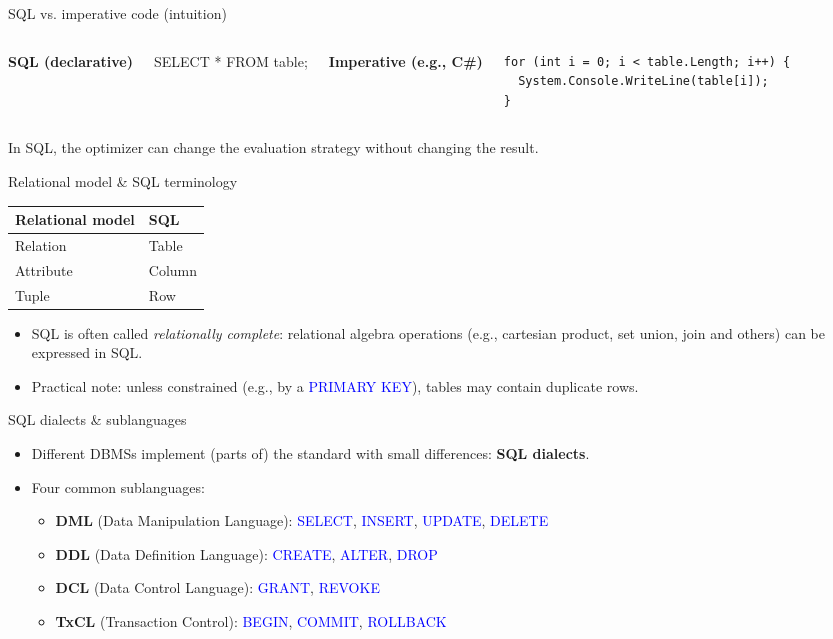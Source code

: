 \documentclass[10pt,aspectratio=169]{beamer}
\newcommand{\sqlk}[1]{\textcolor{blue}{#1}}
\begin{document}
\begin{frame}[fragile]{SQL vs. imperative code (intuition)}
\begin{columns}[T,onlytextwidth]
\textbf{SQL (declarative)}
\begin{codesql}
SELECT *
FROM table;
\end{codesql}
\textbf{Imperative (e.g., C\#)}
\begin{lstlisting}[language={[Sharp]C},basicstyle=\small\ttfamily]
for (int i = 0; i < table.Length; i++) {
  System.Console.WriteLine(table[i]);
}
\end{lstlisting}
\end{columns}
\vspace{0.6em}
\small In SQL, the optimizer can change the evaluation strategy without changing the result.
\end{frame}

\begin{frame}{Relational model \& SQL terminology}
\begin{center}
\begin{tabular}{ll}
\toprule
\textbf{Relational model} & \textbf{SQL}\\
\midrule
Relation & Table\\
Attribute & Column\\
Tuple & Row\\
\bottomrule
\end{tabular}
\end{center}
\vspace{0.8em}
\begin{itemize}
  \item SQL is often called \emph{relationally complete}: relational algebra operations (e.g., cartesian product, set union, join and others) can be expressed in SQL.
  \item Practical note: unless constrained (e.g., by a \sqlk{PRIMARY KEY}), tables may contain duplicate rows.
\end{itemize}
\end{frame}

\begin{frame}{SQL dialects \& sublanguages}
\begin{itemize}
  \item Different DBMSs implement (parts of) the standard with small differences: \textbf{SQL dialects}.
  \item Four common sublanguages:
  \begin{itemize}
    \item \textbf{DML} (Data Manipulation Language): \sqlk{SELECT}, \sqlk{INSERT}, \sqlk{UPDATE}, \sqlk{DELETE}
    \item \textbf{DDL} (Data Definition Language): \sqlk{CREATE}, \sqlk{ALTER}, \sqlk{DROP}
    \item \textbf{DCL} (Data Control Language): \sqlk{GRANT}, \sqlk{REVOKE}
    \item \textbf{TxCL} (Transaction Control): \sqlk{BEGIN}, \sqlk{COMMIT}, \sqlk{ROLLBACK}
  \end{itemize}
\end{itemize}
\end{frame}
\end{document}
